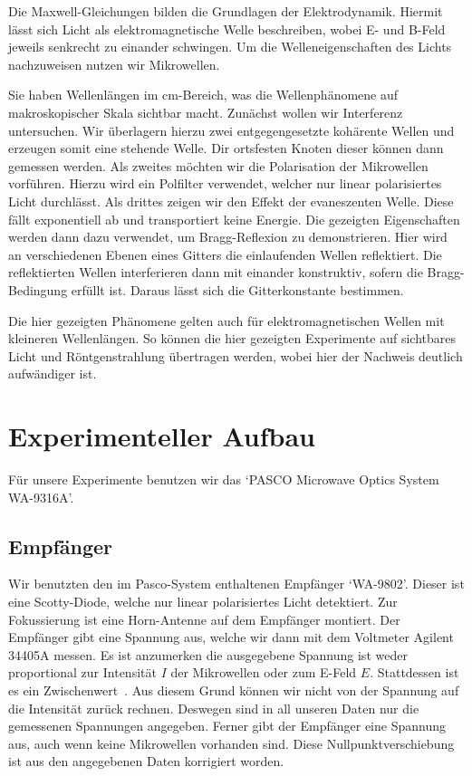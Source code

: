 \documentclass[a4paper,10pt,twocolumn]{article}
\begin{document}
    Die Maxwell-Gleichungen bilden die Grundlagen der Elektrodynamik. %
    Hiermit lässt sich Licht als elektromagnetische Welle beschreiben,
    wobei E- und B-Feld jeweils senkrecht zu einander schwingen.
    Um die Welleneigenschaften des Lichts nachzuweisen nutzen wir Mikrowellen.
    
    Sie haben Wellenlängen im cm-Bereich, was die Wellenphänomene auf makroskopischer Skala sichtbar macht.
    Zunächst wollen wir Interferenz untersuchen.
    Wir überlagern hierzu zwei entgegengesetzte kohärente Wellen und erzeugen somit eine stehende Welle.
    Dir ortsfesten Knoten dieser können dann gemessen werden.
    Als zweites möchten wir die Polarisation der Mikrowellen vorführen.
    Hierzu wird ein Polfilter verwendet, welcher nur linear polarisiertes Licht durchlässt.
    Als drittes zeigen wir den Effekt der evaneszenten Welle.
    Diese fällt exponentiell ab und transportiert keine Energie.
    Die gezeigten Eigenschaften werden dann dazu verwendet, um Bragg-Reflexion zu demonstrieren.
    Hier wird an verschiedenen Ebenen eines Gitters die einlaufenden Wellen reflektiert.
    Die reflektierten Wellen interferieren dann mit einander konstruktiv, sofern die Bragg-Bedingung erfüllt ist.
    Daraus lässt sich die Gitterkonstante bestimmen.
    
    Die hier gezeigten Phänomene gelten auch für elektromagnetischen Wellen mit kleineren Wellenlängen.
    So können die hier gezeigten Experimente auf sichtbares Licht und Röntgenstrahlung übertragen werden,
    wobei hier der Nachweis deutlich aufwändiger ist.
    
    
    \section{Experimenteller Aufbau}
    Für unsere Experimente benutzen wir das `PASCO Microwave Optics System WA-9316A'.
    \subsection{Empfänger}
    
    Wir benutzten den im Pasco-System enthaltenen Empfänger `WA-9802'.
    Dieser ist eine Scotty-Diode, welche nur linear polarisiertes Licht detektiert.
    Zur Fokussierung ist eine Horn-Antenne auf dem Empfänger montiert.
    Der Empfänger gibt eine Spannung aus, welche wir dann mit dem Voltmeter Agilent 34405A messen.
    Es ist anzumerken die ausgegebene Spannung ist weder proportional zur Intensität $I$ der Mikrowellen oder zum E-Feld $E$.
    Stattdessen ist es ein Zwischenwert~\cite{pasco}.
    Aus diesem Grund können wir nicht von der Spannung auf die Intensität zurück rechnen.
    Deswegen sind in all unseren Daten nur die gemessenen Spannungen angegeben.
    Ferner gibt der Empfänger eine Spannung aus, auch wenn keine Mikrowellen vorhanden sind.
    Diese Nullpunktverschiebung ist aus den angegebenen Daten korrigiert worden.
    
\end{document}
